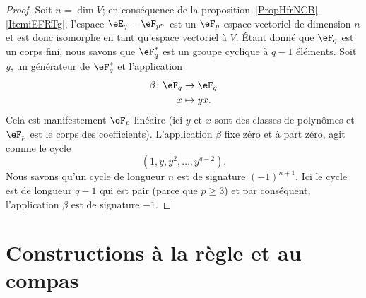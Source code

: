 \begin{proof}
	Soit \( n=\dim V\); en conséquence de la proposition~\ref{PropHfrNCB}\ref{ItemiEFRTg}, l'espace \( \eE_q=\eF_{p^n}\) est un \( \eF_p\)-espace vectoriel de dimension \( n\) et est donc isomorphe en tant qu'espace vectoriel à \( V\). Étant donné que \( \eF_q\) est un corps fini, nous savons que \( \eF_q^*\) est un groupe cyclique à \( q-1\) éléments. Soit \( y\), un générateur de \( \eF_q^*\) et l'application
	\begin{equation}
		\begin{aligned}
			\beta\colon \eF_q & \to \eF_q   \\
			x                 & \mapsto yx.
		\end{aligned}
	\end{equation}
	Cela est manifestement \( \eF_p\)-linéaire (ici \( y\) et \( x\) sont des classes de polynômes et \( \eF_p\) est le corps des coefficients). L'application \( \beta\) fixe zéro et à part zéro, agit comme le cycle
	\begin{equation}
		(1,y,y^2,\ldots, y^{q-2}).
	\end{equation}
	Nous savons qu'un cycle de longueur \( n\) est de signature \( (-1)^{n+1}\). Ici le cycle est de longueur \( q-1\) qui est pair (parce que \( p\geq 3\)) et par conséquent, l'application \( \beta\) est de signature \( -1\).
\end{proof}

\section{Constructions à la règle et au compas}

